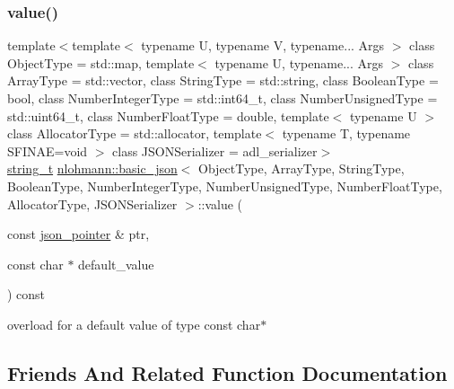 \subsubsection{\texorpdfstring{value()}{value()}\hspace{0.1cm}{\footnotesize\ttfamily [4/4]}}
{\footnotesize\ttfamily template$<$template$<$ typename U, typename V, typename... Args $>$ class Object\+Type = std\+::map, template$<$ typename U, typename... Args $>$ class Array\+Type = std\+::vector, class String\+Type  = std\+::string, class Boolean\+Type  = bool, class Number\+Integer\+Type  = std\+::int64\+\_\+t, class Number\+Unsigned\+Type  = std\+::uint64\+\_\+t, class Number\+Float\+Type  = double, template$<$ typename U $>$ class Allocator\+Type = std\+::allocator, template$<$ typename T, typename S\+F\+I\+N\+A\+E=void $>$ class J\+S\+O\+N\+Serializer = adl\+\_\+serializer$>$ \\
\mbox{\hyperlink{classnlohmann_1_1basic__json_a61f8566a1a85a424c7266fb531dca005}{string\+\_\+t}} \mbox{\hyperlink{classnlohmann_1_1basic__json}{nlohmann\+::basic\+\_\+json}}$<$ Object\+Type, Array\+Type, String\+Type, Boolean\+Type, Number\+Integer\+Type, Number\+Unsigned\+Type, Number\+Float\+Type, Allocator\+Type, J\+S\+O\+N\+Serializer $>$\+::value (\begin{DoxyParamCaption}\item[{const \mbox{\hyperlink{classnlohmann_1_1basic__json_a6886a5001f5b449ad316101a311ce536}{json\+\_\+pointer}} \&}]{ptr,  }\item[{const char $\ast$}]{default\+\_\+value }\end{DoxyParamCaption}) const\hspace{0.3cm}{\ttfamily [inline]}}



overload for a default value of type const char$\ast$ 



\subsection{Friends And Related Function Documentation}
\mbox{\label{classnlohmann_1_1basic__json_a6e2e21da48f5d9471716cd868a068327}} 
